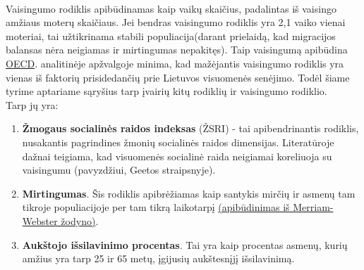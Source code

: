 \paragraph{} Vaisingumo rodiklis apibūdinamas kaip vaikų skaičius, padalintas iš vaisingo amžiaus moterų skaičiaus. Jei bendras vaisingumo rodiklis yra 2,1 vaiko vienai moteriai, tai užtikrinama stabili populiacija(darant prielaidą, kad migracijos balansas nėra neigiamas ir mirtingumas nepakitęs). Taip vaisingumą apibūdina \hyperlink{oecd}{OECD}.
\hypertarget{sen_lt_vis}{\textcite{sensltvis}} analitinėje apžvalgoje minima, kad mažėjantis vaisingumo rodiklis yra vienas iš faktorių prisidedančių prie Lietuvos visuomenės senėjimo.
Todėl šiame tyrime aptariame sąryšius tarp įvairių kitų rodiklių ir vaisingumo rodiklio. \\
Tarp jų yra:
\begin{enumerate}
    \item \textbf{Žmogaus socialinės raidos indeksas} (ŽSRI) - tai apibendrinantis rodiklis, nusakantis pagrindines žmonių socialinės raidos dimensijas. Literatūroje dažnai teigiama, kad visuomenės socialinė raida neigiamai koreliuoja su vaisingumu (pavyzdžiui, Geetos \textcite{nargund2009declining} straipsnyje).
    \item \textbf{Mirtingumas}. Šis rodiklis apibrėžiamas kaip santykis mirčių ir asmenų tam tikroje populiacijoje per tam tikrą laikotarpį \hyperlink{merriam}{(apibūdinimas iš Merriam-Webster žodyno)}. 
    \item \textbf{Aukštojo išsilavinimo procentas}. Tai yra kaip procentas asmenų, kurių amžius yra tarp 25 ir 65 metų, įgijusių aukštesnįjį išsilavinimą.
\end{enumerate}